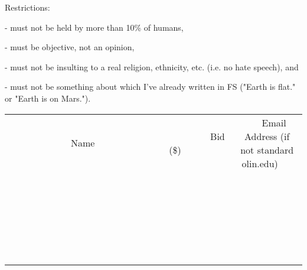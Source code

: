 \documentclass[11pt]{article}
\begin{document}
Restrictions:

 - must not be held by more than 10\% of humans,

 - must be objective, not an opinion,

 - must not be insulting to a real religion, ethnicity, etc. (i.e. no hate speech), and

 - must not be something about which I've already written in FS ("Earth is flat." or "Earth is on Mars."). \\
					[6ex]
					\begin{tabular}{c c c}
						~~~~~~~~~~~~~Name~~~~~~~~~~~~~ & ~~~~~~~~~Bid (\$)~~~~~~~~~ & ~~~Email Address (if not standard olin.edu)~~~ \\
				
 & & \\
\hline
 & & \\
\hline
 & & \\
\hline
 & & \\
\hline
 & & \\
\hline
 & & \\
\hline
 & & \\
\hline
 & & \\
\hline
 & & \\
\hline
 & & \\
\hline
 & & \\
\hline
 & & \\
\hline
 & & \\
\hline
 & & \\
\hline
 & & \\
\hline
 & & \\
\hline
 & & \\
\hline
 & & \\
\hline
 & & \\
\hline
 & & \\
\hline
 & & \\
\hline
 & & \\
\hline
 & & \\
\hline
 & & \\
\hline
 & & \\
\hline
 & & \\
\hline
					\end{tabular}
					\clearpage
				
\end{document}
